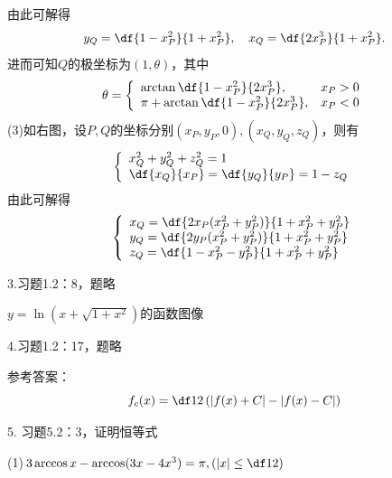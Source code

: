 由此可解得
$$y_Q=\df{1-x^2_P}{1+x^2_P},\quad x_Q=\df{2x_P^3}{1+x^2_P}.$$
进而可知$Q$的极坐标为$(1,\theta)$，其中
$$\theta=
\left\{
\begin{array}{ll}
	\arctan\df{1-x^2_P}{2x^3_P},& x_P>0\\
	\pi+\arctan\df{1-x^2_P}{2x^3_P}, & x_P<0
\end{array}
\right.
$$
(3)如右图，设$P,Q$的坐标分别$(x_P,y_P,0),(x_Q,y_Q,z_Q)$，则有
$$
\left\{
\begin{array}{l}
	x^2_Q+y^2_Q+z^2_Q=1\\
	\df{x_Q}{x_P}=\df{y_Q}{y_P}=1-z_Q
\end{array}
\right.
$$
由此可解得
$$
\left\{
\begin{array}{l}
	x_Q=\df{2x_P(x^2_P+y^2_P)}{1+x^2_P+y^2_P}\\
	y_Q=\df{2y_P(x^2_P+y^2_P)}{1+x^2_P+y^2_P}\\
	z_Q=\df{1-x^2_P-y^2_P}{1+x^2_P+y^2_P}
\end{array}
\right.
$$

\bigskip

3.习题1.2：8，题略

\begin{center}
	
	$y=\ln(x+\sqrt{1+x^2})$的函数图像
\end{center}

\bigskip

4.习题1.2：17，题略

参考答案：
$$f_c(x)=\df12\left(|f(x)+C|-|f(x)-C|\right)$$

\bigskip

5. 习题5.2：3，证明恒等式

(1)$3\arccos x-\arccos(3x-4x^3)=\pi,\left(|x|\leq\df12\right)$

